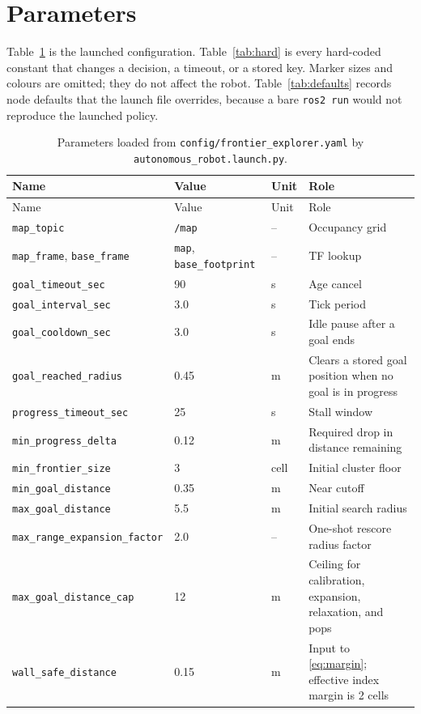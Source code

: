 \documentclass[11pt]{article}
\begin{document}
\section{Parameters}
Table~\ref{tab:yaml} is the launched configuration. Table~\ref{tab:hard} is every hard-coded constant that changes a decision, a timeout, or a stored key. Marker sizes and colours are omitted; they do not affect the robot. Table~\ref{tab:defaults} records node defaults that the launch file overrides, because a bare \texttt{ros2 run} would not reproduce the launched policy.

\begin{longtable}{@{}p{4.0cm}p{2.3cm}p{1.2cm}p{6.3cm}@{}}
\caption{Parameters loaded from \texttt{config/frontier\_explorer.yaml} by \texttt{autonomous\_robot.launch.py}.}\label{tab:yaml}\\
\toprule
Name & Value & Unit & Role \\
\midrule
\endfirsthead
\toprule
Name & Value & Unit & Role \\
\midrule
\endhead
\texttt{map\_topic} & \texttt{/map} & -- & Occupancy grid \\
\texttt{map\_frame}, \texttt{base\_frame} & \texttt{map}, \texttt{base\_footprint} & -- & TF lookup \\
\texttt{goal\_timeout\_sec} & 90 & s & Age cancel \\
\texttt{goal\_interval\_sec} & 3.0 & s & Tick period \\
\texttt{goal\_cooldown\_sec} & 3.0 & s & Idle pause after a goal ends \\
\texttt{goal\_reached\_radius} & 0.45 & m & Clears a stored goal position when no goal is in progress \\
\texttt{progress\_timeout\_sec} & 25 & s & Stall window \\
\texttt{min\_progress\_delta} & 0.12 & m & Required drop in distance remaining \\
\texttt{min\_frontier\_size} & 3 & cell & Initial cluster floor \\
\texttt{min\_goal\_distance} & 0.35 & m & Near cutoff \\
\texttt{max\_goal\_distance} & 5.5 & m & Initial search radius \\
\texttt{max\_range\_expansion\_factor} & 2.0 & -- & One-shot rescore radius factor \\
\texttt{max\_goal\_distance\_cap} & 12 & m & Ceiling for calibration, expansion, relaxation, and pops \\
\texttt{wall\_safe\_distance} & 0.15 & m & Input to \eqref{eq:margin}; effective index margin is 2 cells \\

\end{longtable}
\end{document}
